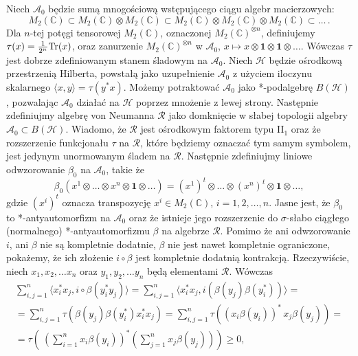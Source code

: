 Niech $\mathcal{A}_{0}$ będzie sumą mnogościową wstępującego ciągu algebr macierzowych:
\begin{equation}
M_{2}(\mathbb{C}) \subset
M_{2}(\mathbb{C}) \otimes M_{2}(\mathbb{C}) \subset
M_{2}(\mathbb{C}) \otimes M_{2}(\mathbb{C}) \otimes M_{2}(\mathbb{C}) \subset
\ldots\, .
\end{equation}
Dla $n$-tej potęgi tensorowej $M_{2}(\mathbb{C})$,
oznaczonej $M_{2}(\mathbb{C})^{\otimes n}$,
definiujemy $\tau(x) = \frac{1}{2^{n}} {\rm Tr}(x)$,
oraz zanurzenie
$M_{2}(\mathbb{C})^{\otimes n}$ w $\mathcal{A}_{0}$,
$x \mapsto x \otimes \mathbf{1} \otimes \mathbf{1} \otimes \ldots$.
Wówczas $\tau$ jest dobrze zdefiniowanym stanem śladowym na $\mathcal{A}_{0}$.
Niech $\mathcal{H}$ będzie ośrodkową przestrzenią Hilberta, powstałą jako uzupełnienie
$\mathcal{A}_{0}$ z użyciem iloczynu skalarnego
$\langle x , y \rangle = \tau(y^{*} x )$.
Możemy potraktować $\mathcal{A}_{0}$ jako
\mbox{*-podalgebrę} $B(\mathcal{H})$,
pozwalając $\mathcal{A}_{0}$ działać na $\mathcal{H}$ poprzez mnożenie z lewej strony.
Następnie zdefiniujmy algebrę von Neumanna
$\mathcal{R}$ jako domknięcie w słabej topologii algebry
$\mathcal{A}_{0} \subset B(\mathcal{H})$.
Wiadomo, że
$\mathcal{R}$ jest ośrodkowym faktorem typu II$\phantom{}_{1}$
oraz że rozszerzenie funkcjonału $\tau$ na $\mathcal{R}$,
które będziemy oznaczać tym samym symbolem,
jest jedynym unormowanym śladem na $\mathcal{R}$.
Następnie zdefiniujmy liniowe odwzorowanie
$\beta_{0}$ na $\mathcal{A}_{0}$, takie że
\begin{equation}
\beta_{0}(x^{1} \otimes \ldots\otimes x^{n} \otimes \mathbf{1} \otimes \ldots ) =
(x^{1})^{t} \otimes \ldots\otimes (x^{n})^{t} \otimes \mathbf{1} \otimes \ldots,
\end{equation}
gdzie $(x^{i})^{t}$ oznacza transpozycję $x^{i} \in M_{2}(\mathbb{C})$,
$i = 1,2,\ldots,n$.
Jasne jest, że $\beta_{0}$ to *-antyautomorfizm na $\mathcal{A}_{0}$
oraz że istnieje jego rozszerzenie do $\sigma$-słabo ciągłego (normalnego)
*-antyautomorfizmu $\beta$ na algebrze $\mathcal{R}$.
Pomimo że ani odwzorowanie $i$, ani $\beta$ nie są kompletnie dodatnie,
$\beta$ nie jest nawet kompletnie ograniczone,
pokażemy, że ich złożenie $i \circ \beta$ jest kompletnie dodatnią kontrakcją.
Rzeczywiście, niech $x_{1}, x_{2}, \ldots x_{n}$ oraz
$y_{1}, y_{2}, \ldots y_{n}$ będą elementami $\mathcal{R}$.
Wówczas
\begin{multline}
\sum \limits_{i, j =1}^{n}
\langle x_{i}^{*} x_{j}, i \circ \beta(y_{i}^{*} y_{j}) \rangle =
\sum \limits_{i, j =1}^{n}
\langle x_{i}^{*} x_{j}, i ( \beta( y_{j}) \beta(y_{i}^{*})) \rangle = \\
=\sum \limits_{i, j =1}^{n}
\tau \left(\beta( y_{j}) \beta(y_{i}^{*}) x_{i}^{*} x_{j}\right) =
\sum \limits_{i, j =1}^{n} \tau \left( (x_{i} \beta(y_{i}) )^{*} \,  x_{j} \beta( y_{j})
\right) =\\
= \tau \left( \
\left( \sum \limits_{i=1}^{n} x_{i} \beta(y_{i}) \right)^{*}
\left( \sum \limits_{j=1}^{n} x_{j} \beta(y_{j}) \right)\right ) \geq 0,
\end{multline}
